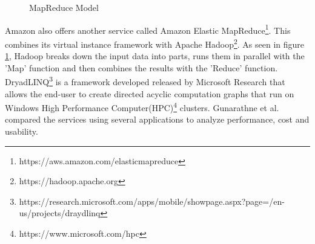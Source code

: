 \documentclass[12pt]{article}
\begin{document}
\begin{figure}
    \begin{center}
    \end{center}
    \caption{MapReduce Model}
    \label{fig:map}
\end{figure}

Amazon also offers another service called Amazon Elastic
MapReduce\footnote{https://aws.amazon.com/elasticmapreduce}. This combines its
virtual instance framework with Apache
Hadoop\footnote{https://hadoop.apache.org}. As seen in figure \ref{fig:map},
Hadoop breaks down the input data into parts, runs them in parallel with the
'Map' function and then combines the results with the 'Reduce' function.
DryadLINQ\footnote{https://research.microsoft.com/apps/mobile/showpage.aspx?page=/en-us/projects/draydlinq}
is a framework developed released by Microsoft Research that allows the end-user
to create directed acyclic computation graphs that run on Windows High
Performance Computer(HPC)\footnote{https://www.microsoft.com/hpc} clusters. 
Gunarathne et al. compared the services using several applications to analyze
performance, cost and usability.
\end{document}
